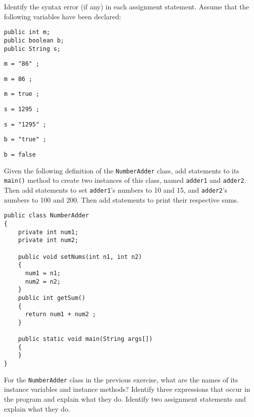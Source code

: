 \begin{EXRtwo}
\item  Identify the syntax error (if any) in each assignment statement.
Assume that the following variables have been declared:

\begin{jjjlisting}
\begin{lstlisting}
public int m;
public boolean b;
public String s;
\end{lstlisting}
\end{jjjlisting}

\begin{EXRtwoLL}
\begin{multicols}{2}
\item  {\tt m = "86" ;}
\item  {\tt m = 86 ;}
\item  {\tt m = true ;}
\item  {\tt s = 1295 ;}
\item  {\tt s = "1295" ;}
\item  {\tt b = "true" ;}
\item  {\tt b = false}
\end{multicols}
\end{EXRtwoLL}

\item  Given the following definition of the {\tt NumberAdder} class,
add statements to its {\tt main()} method to create two instances of
this class, named {\tt adder1} and {\tt adder2}.  Then add statements
to set {\tt adder1}'s numbers to 10 and 15, and {\tt adder2}'s numbers
to 100 and 200. Then add statements to print their respective sums.

\begin{jjjlisting}
\begin{lstlisting}
public class NumberAdder
{
    private int num1;
    private int num2;

    public void setNums(int n1, int n2)
    {
      num1 = n1;
      num2 = n2;
    }
    public int getSum()
    {
      return num1 + num2 ;
    }

    public static void main(String args[])
    {
    }
}
\end{lstlisting}
\end{jjjlisting}

\item  For the {\tt NumberAdder} class in the previous
exercise, what are the names of its instance variables and instance
methods? Identify three expressions that occur in the program and
explain what they do.  Identify two assignment statements and explain
what they do.


\end{EXRtwo}
